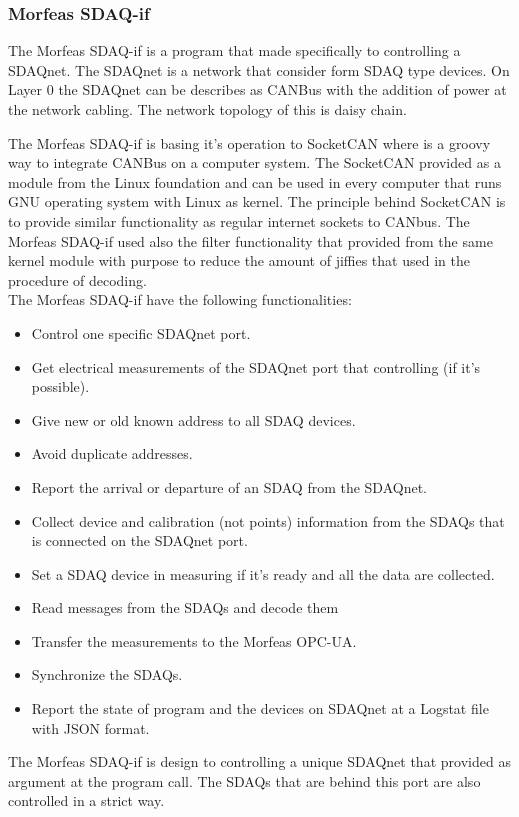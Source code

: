\subsubsection{Morfeas SDAQ-if}
The Morfeas SDAQ-if is a program that made specifically to controlling a SDAQnet. The SDAQnet is a network that consider form SDAQ type devices.
On Layer 0 the SDAQnet can be describes as CANBus with the addition of power at the network cabling. The network topology of this is daisy chain.

The Morfeas SDAQ-if is basing it's operation to SocketCAN where is a groovy way to integrate CANBus on a computer system. The SocketCAN provided as a module from the Linux
foundation and can be used in every computer that runs GNU operating system with Linux as kernel. The principle behind SocketCAN is to provide similar functionality as regular internet sockets to CANbus.
The Morfeas SDAQ-if used also the filter functionality that provided from the same kernel module with purpose to reduce the amount of jiffies that used in the procedure of decoding.\\
The Morfeas SDAQ-if have the following functionalities:
\begin{itemize}
	\item Control one specific SDAQnet port.
	\item Get electrical measurements of the SDAQnet port that controlling (if it's possible).
	\item Give new or old known address to all SDAQ devices.
	\item Avoid duplicate addresses.
	\item Report the arrival or departure of an SDAQ from the SDAQnet.
	\item Collect device and calibration (not points) information from the SDAQs that is connected on the SDAQnet port.
	\item Set a SDAQ device in measuring if it's ready and all the data are collected.
	\item Read messages from the SDAQs and decode them
	\item Transfer the measurements to the Morfeas OPC-UA.
	\item Synchronize the SDAQs.
	\item Report the state of program and the devices on SDAQnet at a Logstat file with JSON format.
\end{itemize}
The Morfeas SDAQ-if is design to controlling a unique SDAQnet that provided as argument at the program call. The SDAQs that are behind this port are also controlled in a strict way.\\
